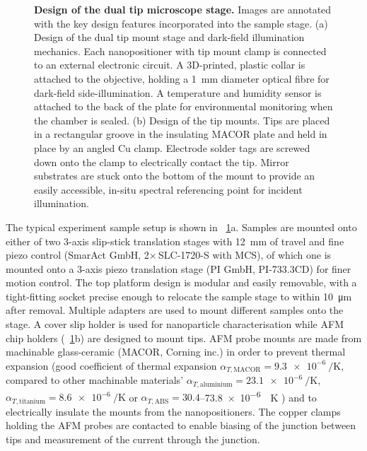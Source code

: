 \documentclass{article}
\begin{document}
\begin{figure}[bt]
\begin{subfigure}[t]{0.43\textwidth}
\end{subfigure}
\caption[Design of the dual tip microscope stage]{\textbf{Design of the dual tip microscope stage.} Images are annotated with the key design features incorporated into the sample stage.
(a) Design of the dual tip mount stage and dark-field illumination mechanics. Each nanopositioner with tip mount clamp is connected to an external electronic circuit. A 3D-printed, plastic collar is attached to the objective, holding a \SI{1}{mm} diameter optical fibre for dark-field side-illumination. A temperature and humidity sensor is attached to the back of the plate for environmental monitoring when the chamber is sealed.
(b) Design of the tip mounts. Tips are placed in a rectangular groove in the insulating MACOR plate and held in place by an angled Cu clamp. Electrode solder tags are screwed down onto the clamp to electrically contact the tip. Mirror substrates are stuck onto the bottom of the mount to provide an easily accessible, in-situ spectral referencing point for incident illumination.}
\label{fig:tip_mount_design}
\vspace{-15pt}
\end{figure}

The typical experiment sample setup is shown in \figurename~\ref{fig:tip_mount_design}a. Samples are mounted onto either of two 3-axis slip-stick translation stages with \SI{12}{mm} of travel and fine piezo control (SmarAct GmbH, 2$\times$\,SLC-1720-S with MCS), of which one is mounted onto a 3-axis piezo translation stage (PI GmbH, PI-733.3CD) for finer motion control. The top platform design is modular and easily removable, with a tight-fitting socket precise enough to relocate the sample stage to within \SI{10}{\micro\metre} after removal. Multiple adapters are used to mount different samples onto the stage. A cover slip holder is used for nanoparticle characterisation while AFM chip holders (\figurename~\ref{fig:tip_mount_design}b) are designed to mount tips.
AFM probe mounts are made from machinable glass-ceramic (MACOR, Corning inc.) in order to prevent thermal expansion (good coefficient of thermal expansion $\alpha_{T, \mathrm{MACOR}}=\SI{9.3e-6}{\per\kelvin}$, compared to other machinable materials' $\alpha_{T,\mathrm{aluminium}}=\SI{23.1e-6}{\per\kelvin}$, $\alpha_{T, \mathrm{titanium}}=\SI{8.6e-6}{\per\kelvin}$ or $\alpha_{T, \mathrm{ABS}}=30.4$--\SI{73.8e-6}{\per\kelvin} \cite{haynes2013crc}) and to electrically insulate the mounts from the nanopositioners. The copper clamps holding the AFM probes are contacted to enable biasing of the junction between tips and measurement of the current through the junction.
\end{document}

